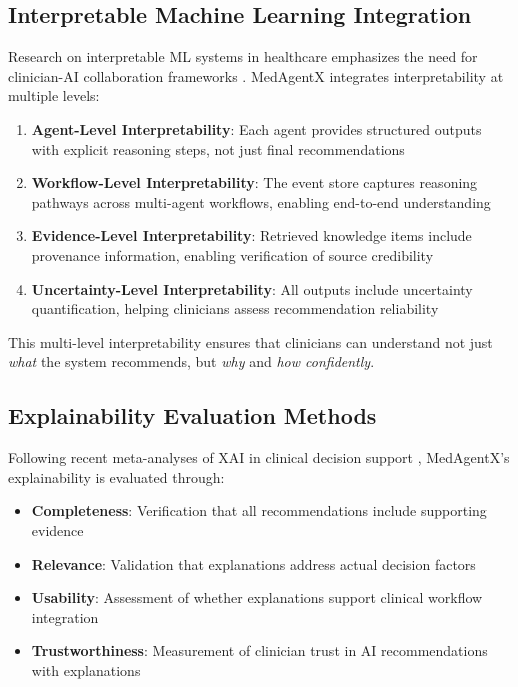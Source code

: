\documentclass[journal]{IEEEtran}
\begin{document}
\subsection{Interpretable Machine Learning Integration}
Research on interpretable ML systems in healthcare emphasizes the need for clinician-AI collaboration frameworks \cite{interpretable_ml_healthcare_2023}. MedAgentX integrates interpretability at multiple levels:

\begin{enumerate}
    \item \textbf{Agent-Level Interpretability}: Each agent provides structured outputs with explicit reasoning steps, not just final recommendations
    \item \textbf{Workflow-Level Interpretability}: The event store captures reasoning pathways across multi-agent workflows, enabling end-to-end understanding
    \item \textbf{Evidence-Level Interpretability}: Retrieved knowledge items include provenance information, enabling verification of source credibility
    \item \textbf{Uncertainty-Level Interpretability}: All outputs include uncertainty quantification, helping clinicians assess recommendation reliability
\end{enumerate}

This multi-level interpretability ensures that clinicians can understand not just \textit{what} the system recommends, but \textit{why} and \textit{how confidently}.

\subsection{Explainability Evaluation Methods}
Following recent meta-analyses of XAI in clinical decision support \cite{xai_meta_2024}, MedAgentX's explainability is evaluated through:

\begin{itemize}
    \item \textbf{Completeness}: Verification that all recommendations include supporting evidence
    \item \textbf{Relevance}: Validation that explanations address actual decision factors
    \item \textbf{Usability}: Assessment of whether explanations support clinical workflow integration
    \item \textbf{Trustworthiness}: Measurement of clinician trust in AI recommendations with explanations
\end{itemize}
\end{document}

